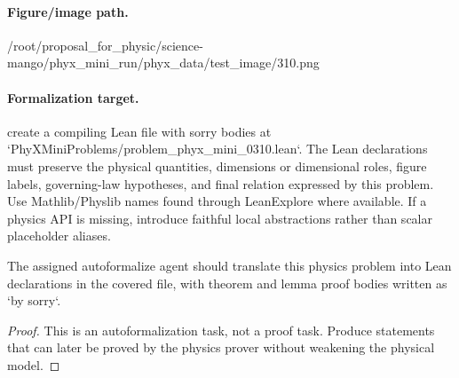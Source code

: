 \paragraph{Figure/image path.}
/root/proposal\_for\_physic/science-mango/phyx\_mini\_run/phyx\_data/test\_image/310.png

\paragraph{Formalization target.}
create a compiling Lean file with sorry bodies at `PhyXMiniProblems/problem\_phyx\_mini\_0310.lean`. The Lean declarations must preserve the physical quantities, dimensions or dimensional roles, figure labels, governing-law hypotheses, and final relation expressed by this problem.
Use Mathlib/Physlib names found through LeanExplore where available. If a physics API is missing, introduce faithful local abstractions rather than scalar placeholder aliases.

\begin{theorem}
\label{thm:physics:phyx_mini_0310:target}
The assigned autoformalize agent should translate this physics problem into Lean declarations in the covered file, with theorem and lemma proof bodies written as `by sorry`.
\end{theorem}
\begin{proof}
This is an autoformalization task, not a proof task. Produce statements that can later be proved by the physics prover without weakening the physical model.
\end{proof}

